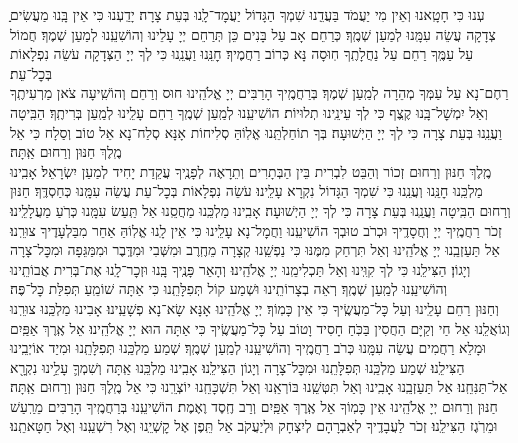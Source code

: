 \documentclass[twoside, openany, parskip=half, 11pt]{book}
\begin{document}
ַֽעְנוּ כִּי חָטָֽאנוּ וְאֵין מִי יַעֲמֹד בַּעֲדֵֽנוּ שִׁמְךָ הַגָּדוֹל יַעֲמׇד־לָֽנוּ בְּעֵת צָרָה׃ יָדַֽעְנוּ כִּי אֵין בָּֽנוּ מַעֲשִׂים צְדָקָה עֲשֵׂה עִמָּֽנוּ לְמַעַן שְׁמֶֽךָ׃ כְּרַחֵם אָב עַל בָּנִים כֵּן תְּרַחֵם יְיָ עָלֵינוּ וְהוֹשִׁעֵֽנוּ לְמַעַן שְׁמֶךָ׃ חֲמוֹל עַל עַמֶּֽךָ רַחֵם עַל נַחֲלָתֶֽךָ חֽוּסָה נָּא כְּרוֹב רַחֲמֶיךָ׃ חׇנֵּֽנוּ וַעֲנֵֽנוּ כִּי לְךָ יְיָ הַצְּדָקָה עֹשֵׂה נִפְלָאוֹת בְּכׇל־עֵת׃\\
רַחֶם־נָא עַל עַמְּךָ מְהֵרָה לְמַֽעַן שְׁמֶךָ׃ בְּרַחֲמֶֽיךָ הָרַבִּים יְיָ אֱלֹהֵֽינוּ חוּס וְרַחֵם וְהוֹשִֽׁיעָה צֹאן מַרְעִיתֶֽךָ וְאַל יִמְשׇׁל־בָּֽנוּ קֶֽצֶף כִּי לְךָ עֵינֵֽינוּ תְלוּיוֹת׃ הוֹשִׁיעֵֽנוּ לְמַֽעַן שְׁמֶֽךָ רַחֵם עָלֵֽינוּ לְמַֽעַן בְּרִיתֶֽךָ׃ הַבִּֽיטָה וַעֲנֵֽנוּ בְּעֵת צָרָה כִּי לְךָ יְיָ הַיְשׁוּעָה׃ בְּךָ תוֹחַלְתֵּֽנוּ אֱלֽוֹהַּ סְלִיחוֹת אָנָּא סְלַח־נָא אֵל טוֹב וְסַלָח כִּי אֵל מֶֽלֶךְ חַנּוּן וְרַחוּם אַֽתָּה׃\\
מֶֽלֶךְ חַנּוּן וְרַחוּם זְכוֹר וְהַבֵּט לִבְרִית בֵּין הַבְּתָרִים וְתֵרָאֶה לְפָנֶֽיךָ עֲקֵדַת יָחִיד לְמַעַן יִשְׂרָאֵל׃ אָבִֽינוּ מַלְכֵּֽנוּ חׇנֵּֽנוּ וְעֲנֵֽנוּ כִּי שִׁמְךָ הַגָּדוֹל נִקְרָא עָלֵֽינוּ׃ עֹשֵׂה נִפְלָאוֹת בְּכׇל־עֵת עֲשֵׂה עִמָּֽנוּ כְּחַסְדֶּֽךָ׃ חַנּוּן וְרַחוּם הַבִּֽיטָה וַעֲנֵֽנוּ בְּעֵת צָרָה כִּי לְךָ יְיָ הַיְשׁוּעָה׃ אָבִֽינוּ מַלְכֵּֽנוּ מַחֲסֵֽנוּ אַל תַּֽעַשׂ עִמָּֽנוּ כְּרֹֽעַ מַעֲלָלֵֽינוּ׃ זְכֹר רַחֲמֶֽיךָ יְיָ וְחֲסָדֶֽיךָ וּכְרֹב טוּבְךָ הוֹשִׁיעֵֽנוּ וַחֲמׇל־נָא עָלֵֽינוּ כִּי אֵין לָֽנוּ אֱלֽוֹהַּ אַחֵר מִבַּלְעָדֶיךָ צוּרֵֽנוּ׃ אַל תַּעַזְבֵֽנוּ יְיָ אֱלֹהֵֽינוּ וְאַל תִּרְחַק מִמֶּנּוּ כִּי נַפְשֵֽׁנוּ קְצָרָה מֵחֶֽרֶב וּמִשְּׁבִי וּמִדֶּֽבֶר וּמִמַּגֵּפָה וּמִכׇּל־צָרָה וְיָגוֹן׃ הַצִּילֵֽנוּ כִּי לְךָ קִוִּֽינוּ וְאַל תַּכְלִימֵֽנוּ יְיָ אֱלֹהֵֽינוּ׃ וְהָאֵר פָּנֶֽיךָ בָּֽנוּ וּזְכׇר־לָֽנוּ אֶת־בְּרִית אֲבוֹתֵֽינוּ וְהוֹשִׁיעֵֽנוּ לְמַֽעַן שְׁמֶֽךָ׃ רְאֵה בְצָרוֹתֵֽינוּ וּשְׁמַע קוֹל תְּפִלָּתֵֽנוּ כִּי אַתָּה שׁוֹמֵֽעַ תְּפִלַּת כׇּל־פֶּה׃\\
וְחַנּוּן רַחֵם עָלֵֽינוּ וְעַל כׇּל־מַעֲשֶֽׂיךָ כִּי אֵין כָּמֽוֹךָ׃ יְיָ אֱלֹהֵֽינוּ אָנָּא שָׂא־נָא פְשָׁעֵֽינוּ׃ אָבִינוּ מַלְכֵּֽנוּ צוּרֵֽנוּ וְגוֹאֲלֵֽנוּ אֵל חַי וְקַיָּם הַחֲסִין בַּכֹּֽחַ חָסִיד וָטוֹב עַל כׇּל־מַעֲשֶֽׂיךָ כִּי אַתָּה הוּא יְיָ אֱלֹהֵֽינוּ׃ אֵל אֶֽרֶךְ אַפַּֽיִם וּמָלֵא רַחֲמִים עֲשֵׂה עִמָּֽנוּ כְּרֹב רַחֲמֶֽיךָ וְהוֹשִׁיעֵֽנוּ לְמַֽעַן שְׁמֶֽךָ׃ שְׁמַע מַלְכֵּֽנוּ תְּפִלָּתֵֽנוּ וּמִיַד אוֹיְבֵֽינוּ הַצִּילֵֽנוּ׃ שְׁמַע מַלְכֵּֽנוּ תְּפִלָּתֵֽנוּ וּמִכׇּל־צָרָה וְיָגוֹן הַצִּילֵֽנוּ׃ אָבִֽינוּ מַלְכֵּֽנוּ אַֽתָּה
וְשִׁמְךָ֛ עָלֵ֥ינוּ נִקְרָ֖א אַל־תַּנִּחֵֽנוּ׃
אַל תַּעַזְבֵֽנוּ אָבִֽינוּ וְאַל תִּטְּשֵֽׁנוּ בּוֹרְאֵֽנוּ וְאַל תִּשְׁכָּחֵֽנוּ יוֹצְרֵֽנוּ כִּי אֵל מֶֽלֶךְ חַנּוּן וְרַחוּם אַֽתָּה׃\\
חַנּוּן וְרַחוּם יְיָ אֱלֹהֵֽינוּ אֵין כָּמֽוֹךָ אֵל אֶֽרֶךְ אַפַּֽיִם וְרַב חֶֽסֶד וֶאֶמֶת׃ הוֹשִׁיעֵֽנוּ בְּרַחֲמֶֽיךָ הָרַבִּים מֵרַֽעַשׁ וּמֵרֹֽגֶז הַצִּילֵֽנוּ׃ זְכֹר לַעֲבָדֶֽיךָ לְאַבְרָהָם לְיִצְחָק וּלְיַעֲקֹב אַל תֵּֽפֶן אֶל קׇשְׁיֵֽנוּ וְאֶל רִשְׁעֵֽנוּ וְאֶל חַטָּאתֵֽנוּ׃
\end{document}
